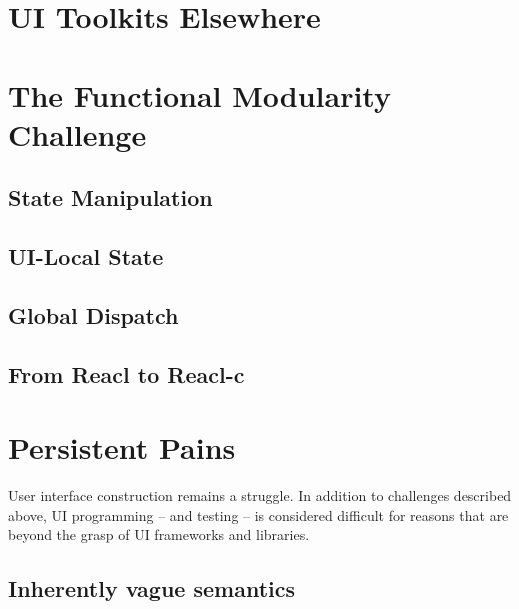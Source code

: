 \documentclass[sigplan,screen]{acmart}
\begin{document}
\section{UI Toolkits Elsewhere}

\section{The Functional Modularity Challenge}

\subsection{State Manipulation}

\subsection{UI-Local State}

\subsection{Global Dispatch}

\subsection{From Reacl to Reacl-c}


\section{Persistent Pains}

User interface construction remains a struggle. In addition to
challenges described above, UI programming -- and testing -- is
considered difficult for reasons that are beyond the grasp of UI
frameworks and libraries.

\subsection{Inherently vague semantics}
\end{document}
